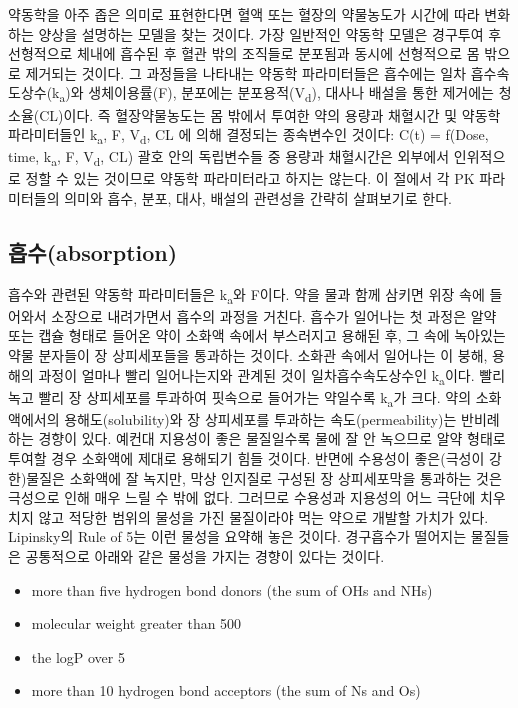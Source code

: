 \documentclass[
  11pt,
  krantz2, a4paper, twoside]{krantz}
\providecommand{\tightlist}{%
  \setlength{\itemsep}{0pt}\setlength{\parskip}{0pt}}
\theoremstyle{definition}
\theoremstyle{definition}
\theoremstyle{definition}
\theoremstyle{definition}
\theoremstyle{remark}
\begin{document}
약동학을 아주 좁은 의미로 표현한다면 혈액 또는 혈장의 약물농도가 시간에
따라 변화하는 양상을 설명하는 모델을 찾는 것이다. 가장 일반적인 약동학
모델은 경구투여 후 선형적으로 체내에 흡수된 후 혈관 밖의 조직들로 분포됨과 동시에 선형적으로 몸 밖으로 제거되는 것이다. 그 과정들을 나타내는 약동학
파라미터들은 흡수에는 일차 흡수속도상수(k\textsubscript{a})와 생체이용률(F), 분포에는
분포용적(V\textsubscript{d}), 대사나 배설을 통한 제거에는 청소율(CL)이다. 즉
혈장약물농도는 몸 밖에서 투여한 약의 용량과 채혈시간 및 약동학
파라미터들인 k\textsubscript{a}, F, V\textsubscript{d}, CL 에 의해 결정되는 종속변수인 것이다: C(t) =
f(Dose, time, k\textsubscript{a}, F, V\textsubscript{d}, CL) 괄호 안의 독립변수들 중 용량과 채혈시간은 외부에서 인위적으로 정할
수 있는 것이므로 약동학 파라미터라고 하지는 않는다. 이 절에서 각 PK
파라미터들의 의미와 흡수, 분포, 대사, 배설의 관련성을 간략히 살펴보기로 한다.

\hypertarget{uxd761uxc218absorption}{%
\subsection{흡수(absorption)}\label{uxd761uxc218absorption}}

흡수와 관련된 약동학 파라미터들은 k\textsubscript{a}와 F이다. 약을 물과 함께 삼키면 위장 속에 들어와서 소장으로 내려가면서 흡수의 과정을 거친다.
흡수가 일어나는 첫 과정은 알약 또는 캡슐 형태로 들어온 약이 소화액 속에서 부스러지고 용해된 후, 그 속에 녹아있는 약물 분자들이 장 상피세포들을 통과하는 것이다.
소화관 속에서 일어나는 이 붕해, 용해의 과정이 얼마나 빨리 일어나는지와 관계된 것이 일차흡수속도상수인 k\textsubscript{a}이다.
빨리 녹고 빨리 장 상피세포를 투과하여 핏속으로 들어가는 약일수록 k\textsubscript{a}가 크다.
약의 소화액에서의 용해도(solubility)와 장 상피세포를 투과하는 속도(permeability)는 반비례하는 경향이 있다.
예컨대 지용성이 좋은 물질일수록 물에 잘 안 녹으므로 알약 형태로 투여할 경우 소화액에 제대로 용해되기 힘들 것이다.
반면에 수용성이 좋은(극성이 강한)물질은 소화액에 잘 녹지만, 막상 인지질로 구성된 장 상피세포막을 통과하는 것은 극성으로 인해 매우 느릴 수 밖에 없다.
그러므로 수용성과 지용성의 어느 극단에 치우치지 않고 적당한 범위의 물성을 가진 물질이라야 먹는 약으로 개발할 가치가 있다.
Lipinsky의 Rule of 5는 이런 물성을 요약해 놓은 것이다.
경구흡수가 떨어지는 물질들은 공통적으로 아래와 같은 물성을 가지는 경향이 있다는 것이다.

\begin{itemize}
\tightlist
\item
  more than five hydrogen bond donors (the sum of OHs and NHs)
\item
  molecular weight greater than 500
\item
  the logP over 5
\item
  more than 10 hydrogen bond acceptors (the sum of Ns and Os)
\end{itemize}
\end{document}

